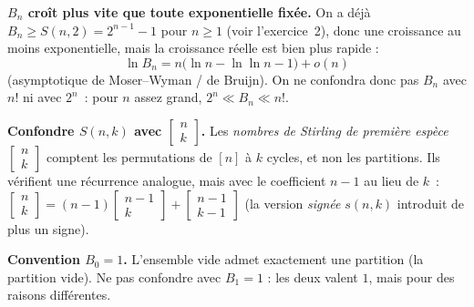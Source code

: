 \begin{mdframed}[style=cexbar]
  \textbf{$B_n$ croît plus vite que toute exponentielle fixée.}\enspace%
  On a déjà $B_n \geq S(n,2) = 2^{n-1}-1$ pour $n\geq 1$ (voir
  l'exercice~2), donc une croissance au moins exponentielle, mais la
  croissance réelle est bien plus rapide :
  \[
    \ln B_n = n\bigl(\ln n - \ln\ln n - 1\bigr) + o(n)
  \]
  (asymptotique de Moser--Wyman / de Bruijn). On ne confondra donc pas $B_n$
  avec $n!$ ni avec $2^n$~: pour $n$ assez grand, $2^n \ll B_n \ll n!$.

  \smallskip\noindent
  \textbf{Confondre $S(n,k)$ avec $\begin{bmatrix}n\\k\end{bmatrix}$.}\enspace%
  Les \emph{nombres de Stirling de première espèce}
  $\begin{bmatrix}n\\k\end{bmatrix}$ comptent les permutations de $[n]$ à
  $k$ cycles, et non les partitions. Ils vérifient une récurrence analogue,
  mais avec le coefficient $n-1$ au lieu de $k$~:
  $\begin{bmatrix}n\\k\end{bmatrix}
   = (n-1)\begin{bmatrix}n-1\\k\end{bmatrix}
   + \begin{bmatrix}n-1\\k-1\end{bmatrix}$
  (la version \emph{signée} $s(n,k)$ introduit de plus un signe).

  \smallskip\noindent
  \textbf{Convention $B_0 = 1$.}\enspace%
  L'ensemble vide admet exactement une partition (la partition vide). Ne pas
  confondre avec $B_1 = 1$ : les deux valent $1$, mais pour des raisons
  différentes.
\end{mdframed}

\vspace{6pt}
\exolabel

